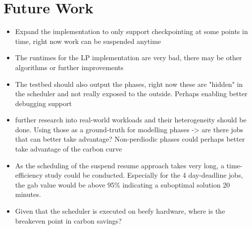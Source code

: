 \chapter{Future Work}

\begin{itemize}
    \item Expand the implementation to only support checkpointing at some points in time, right now work can be suspended anytime
    \item The runtimes for the LP implementation are very bad, there may be other algorithms or further improvements
    \item The testbed should also output the phases, right now these are "hidden" in the scheduler and not really exposed to the outside. Perhaps enabling better debugging support
    \item further research into real-world workloads and their heterogeneity should be done. Using those as a ground-truth for modelling phases -> are there jobs that can better take advantage? Non-perdiodic phases could perhaps better take advantage of the carbon curve
    \item As the scheduling of the suspend resume approach takes very long, a time-efficiency study could be conducted. Especially for the 4 day-deadline jobs, the gab value would be above 95\% indicating a suboptimal solution \@ 20 minutes.
    \item Given that the scheduler is executed on beefy hardware, where is the breakeven point in carbon savings?
\end{itemize}
